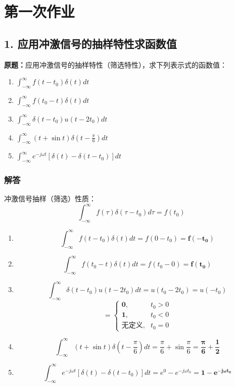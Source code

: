\section{第一次作业}

\subsection{1. 应用冲激信号的抽样特性求函数值}
\noindent\textbf{原题：}应用冲激信号的抽样特性（筛选特性），求下列表示式的函数值：
\begin{enumerate}[label=(\arabic*)]
    \item $\displaystyle \int_{-\infty}^{\infty} f(t-t_0)\delta(t)dt$
    \item $\displaystyle \int_{-\infty}^{\infty} f(t_0-t)\delta(t)dt$
    \item $\displaystyle \int_{-\infty}^{\infty} \delta(t-t_0)u(t-2t_0)dt$
    \item $\displaystyle \int_{-\infty}^{\infty} (t+\sin t)\delta\left(t-\frac{\pi}{6}\right)dt$
    \item $\displaystyle \int_{-\infty}^{\infty} e^{-j\omega t}\left[\delta(t)-\delta(t-t_0)\right]dt$
\end{enumerate}

\subsubsection{解答}
冲激信号抽样（筛选）性质：
\[
\int_{-\infty}^{\infty} f(\tau)\delta(\tau-t_0)d\tau = f(t_0)
\]

\begin{enumerate}[label=(\arabic*)]
    \item
    \[
    \int_{-\infty}^{\infty} f(t-t_0)\delta(t)dt
    = f(0-t_0) = \boldsymbol{f(-t_0)}
    \]

    \item
    \[
    \int_{-\infty}^{\infty} f(t_0-t)\delta(t)dt
    = f(t_0-0) = \boldsymbol{f(t_0)}
    \]

    \item
    \[
    \int_{-\infty}^{\infty} \delta(t-t_0)u(t-2t_0)dt
    = u(t_0-2t_0) = u(-t_0)
    \]
    \[
    = \begin{cases}
    \boldsymbol{0}, & t_0>0 \\
    \boldsymbol{1}, & t_0<0 \\
    \text{无定义}, & t_0=0
    \end{cases}
    \]

    \item
    \[
    \int_{-\infty}^{\infty} (t+\sin t)\delta\left(t-\frac{\pi}{6}\right)dt
    = \frac{\pi}{6} + \sin\frac{\pi}{6}
    = \boldsymbol{\frac{\pi}{6}+\frac{1}{2}}
    \]

    \item
    \[
    \int_{-\infty}^{\infty} e^{-j\omega t}\left[\delta(t)-\delta(t-t_0)\right]dt
    = e^{0} - e^{-j\omega t_0}
    = \boldsymbol{1 - e^{-j\omega t_0}}
    \]
\end{enumerate}

